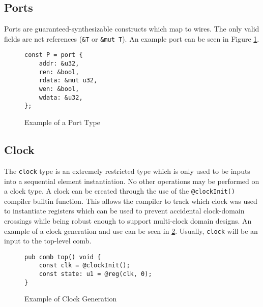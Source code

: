 \documentclass[10pt]{article}
\begin{document}
\subsection{Ports}
Ports are guaranteed-synthesizable constructs which map to wires. The only valid fields are net
references (\verb|&T| or \verb|&mut T|). An example port can be seen in Figure
\ref{fig:port_example}.

\begin{figure}[H]
	\begin{verbatim}
const P = port {
    addr: &u32,
    ren: &bool,
    rdata: &mut u32,
    wen: &bool,
    wdata: &u32,
};
    \end{verbatim}
	\vspace*{-10mm}
	\caption{Example of a Port Type}
	\label{fig:port_example}
\end{figure}

\subsection{Clock}
The \verb|clock| type is an extremely restricted type which is only used to be inputs into
a sequential element instantiation. No other operations may be performed on a clock type. A clock
can be created through the use of the \verb|@clockInit()| compiler builtin function. This allows
the compiler to track which clock was used to instantiate registers which can be used to prevent
accidental clock-domain crossings while being robust enough to support multi-clock domain designs.
An example of a clock generation and use can be seen in \ref{fig:clock_example}. Usually,
\verb|clock| will be an input to the top-level comb.
\begin{figure}[H]
	\begin{verbatim}
pub comb top() void {
    const clk = @clockInit();
    const state: u1 = @reg(clk, 0);
}
    \end{verbatim}
	\vspace*{-10mm}
	\caption{Example of Clock Generation}
	\label{fig:clock_example}
\end{figure}
\end{document}
